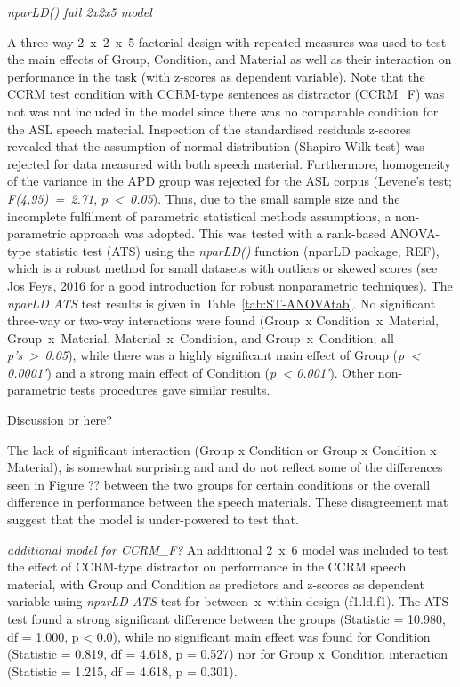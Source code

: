 \documentclass[a4paper, twoside]{templates/ociamthesis}
\begin{document}
\colorbox[HTML]{CCCCFF}{\emph{nparLD() full 2x2x5 model}}

A three-way 2~x~2~x~5 factorial design with repeated measures was used to test the main effects of Group, Condition, and Material as well as their interaction on performance in the task (with z-scores as dependent variable). Note that the CCRM test condition with CCRM-type sentences as distractor (CCRM\_F) was not was not included in the model since there was no comparable condition for the ASL speech material. Inspection of the standardised residuals z-scores revealed that the assumption of normal distribution (Shapiro Wilk test) was rejected for data measured with both speech material. Furthermore, homogeneity of the variance in the APD group was rejected for the ASL corpus (Levene's test; \emph{F(4,95)~=~2.71}, \emph{p~\textless~0.05}). Thus, due to the small sample size and the incomplete fulfilment of parametric statistical methods assumptions, a non-parametric approach was adopted. This was tested with a rank-based ANOVA-type statistic test (ATS) using the \emph{nparLD()} function (nparLD package, REF), which is a robust method for small datasets with outliers or skewed scores (see Jos Feys, 2016 for a good introduction for robust nonparametric techniques). The \emph{nparLD ATS} test results is given in Table~\ref{tab:ST-ANOVAtab}. No significant three-way or two-way interactions were found (Group~x Condition~x~Material, Group~x~Material, Material~x~Condition, and Group~x~Condition; all \emph{p's~\textgreater~0.05}), while there was a highly significant main effect of Group (\emph{p~\textless{} 0.0001'}) and a strong main effect of Condition (\emph{p~\textless{} 0.001'}). Other non-parametric tests procedures gave similar results.

\colorbox[HTML]{CCCCFF}{Discussion or here?}

The lack of significant interaction (Group x Condition or Group x Condition x Material), is somewhat surprising and and do not reflect some of the differences seen in Figure ?? between the two groups for certain conditions or the overall difference in performance between the speech materials. These disagreement mat suggest that the model is under-powered to test that.

\colorbox[HTML]{CCCCFF}{\emph{additional model for CCRM\_F?}}
An additional 2~x~6 model was included to test the effect of CCRM-type distractor on performance in the CCRM speech material, with Group and Condition as predictors and z-scores as dependent variable using \emph{nparLD ATS} test for between~x~within design (f1.ld.f1). The ATS test found a strong significant difference between the groups (Statistic = 10.980, df = 1.000, p \textless{} 0.0), while no significant main effect was found for Condition (Statistic = 0.819, df = 4.618, p = 0.527) nor for Group x~Condition interaction (Statistic = 1.215, df = 4.618, p = 0.301).
\end{document}
